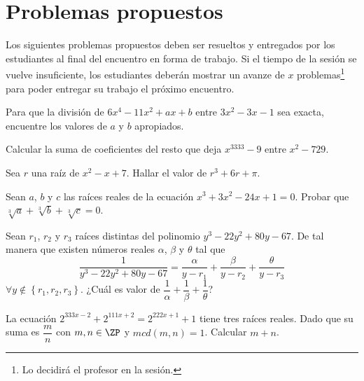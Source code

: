 \section{Problemas propuestos}

Los siguientes problemas propuestos deben ser resueltos y entregados por los estudiantes al final del encuentro en forma de trabajo.
Si el tiempo de la sesión se vuelve insuficiente, los estudiantes deberán mostrar un avanze de $x$ problemas\footnote{Lo decidirá el profesor en la sesión.} para poder entregar su trabajo el próximo encuentro.

\begin{section-problem}
    Para que la división de $6x^4 - 11x^2 + ax + b$ entre $3x^2 - 3x - 1$ sea exacta, encuentre los valores de $a$ y $b$ apropiados.
\end{section-problem}

\begin{section-problem}
    Calcular la suma de coeficientes del resto que deja $x^{3333} - 9$ entre $x^2 - 729$.
\end{section-problem}

\begin{section-problem}
    Sea $r$ una raíz de $x^2 - x + 7$.
    Hallar el valor de $r^3 + 6r + \pi$.
\end{section-problem}

\begin{section-problem}
    Sean $a$, $b$ y $c$ las raíces reales de la ecuación $x^3 + 3x^2 - 24x + 1 = 0$.
    Probar que $\sqrt[3]{a} + \sqrt[3]{b} + \sqrt[3]{c} = 0$.
\end{section-problem}

\begin{section-problem}
    Sean $r_1$, $r_2$ y $r_3$ raíces distintas del polinomio $y^3 - 22 y^2 + 80 y - 67$.
    De tal manera que existen números reales $\alpha$, $\beta$ y $\theta$ tal que
    \[\frac{1}{y^3 - 22 y^2 + 80 y - 67} = \frac{\alpha}{y - r_1} + \frac{\beta}{y - r_2} + \frac{\theta}{y - r_3}\]
    $\forall y \notin \left\{ r_1, r_2, r_3 \right\}$.
    ¿Cuál es valor de $\dfrac{1}{\alpha} + \dfrac{1}{\beta} + \dfrac{1}{\theta}$?
\end{section-problem}

\begin{section-problem}
    La ecuación $2^{333x - 2} + 2^{111x + 2} = 2^{222x + 1} + 1$ tiene tres raíces reales.
    Dado que su suma es $\dfrac{m}{n}$ con $m, n \in \ZP$ y $mcd(m, n) = 1$.
    Calcular $m + n$.
\end{section-problem}


